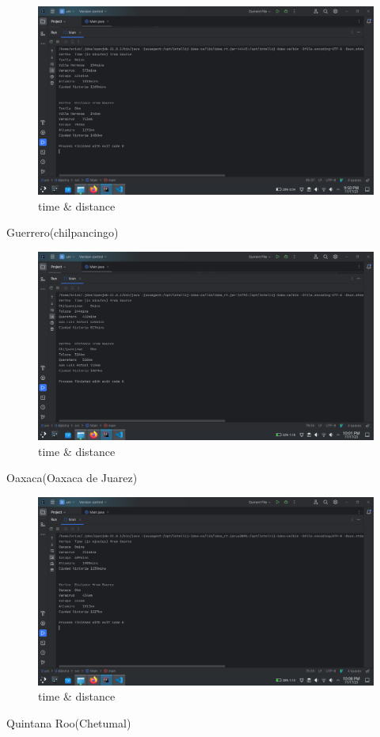 \documentclass{article}
\begin{document}
\begin{figure}[H]
  \centering
  \includegraphics[scale=0.3]{../imgs/tux.png}
  \caption{time \& distance}
  \label{fig:8}
\end{figure}
Guerrero(chilpancingo)

\begin{figure}[H]
  \centering
  \includegraphics[scale=0.3]{../imgs/chil.png}
  \caption{time \& distance}
  \label{fig:9}
\end{figure}
Oaxaca(Oaxaca de Juarez)

\begin{figure}[H]
  \centering
  \includegraphics[scale=0.3]{../imgs/oaxaca.png}
  \caption{time \& distance}
  \label{fig:10}
\end{figure}
Quintana Roo(Chetumal)
\end{document}
